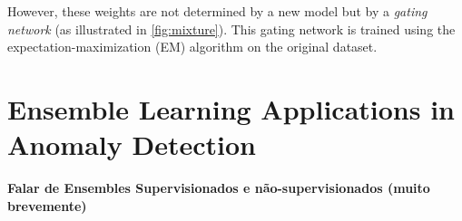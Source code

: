 However, these weights are not determined by a new model but by a \textit{gating network} (as illustrated in \ref{fig:mixture}).
This gating network is trained using the expectation-maximization (EM) algorithm on the original dataset.




	
	


\section{Ensemble Learning Applications in Anomaly Detection}

\textbf{Falar de Ensembles Supervisionados e não-supervisionados (muito brevemente)}


